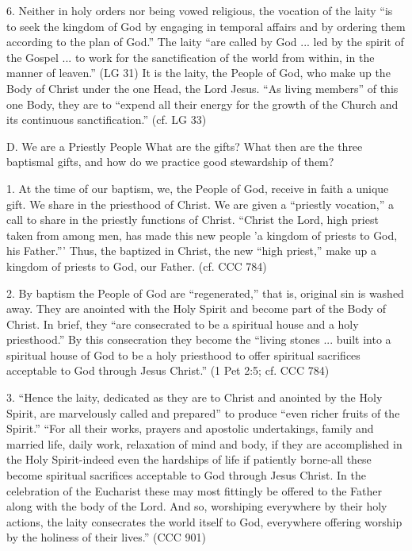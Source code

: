 \documentclass[oneside]{book}
\begin{document}
6. Neither in holy orders nor being vowed religious, the vocation of the laity
``is to seek the kingdom of God by engaging in temporal affairs and by ordering
them according to the plan of God.'' The laity ``are called by God ... led by
the spirit of the Gospel ... to work for the sanctification of the world from
within, in the manner of leaven.'' (LG 31) It is the laity, the People of God,
who make up the Body of Christ under the one Head, the Lord Jesus. ``As living
members'' of this one Body, they are to ``expend all their energy for the growth
of the Church and its continuous sanctification.'' (cf. LG 33)

D. We are a Priestly People
What are the gifts?
What then are the three baptismal gifts, and how do we practice good stewardship
of them?


1. At the time of our baptism, we, the People of God, receive in faith a unique
gift. We share in the priesthood of Christ. We are given a ``priestly
vocation,'' a call to share in the priestly functions of Christ. ``Christ the
Lord, high priest taken from among men, has made this new people 'a kingdom of
priests to God, his Father.''' Thus, the baptized in Christ, the new ``high
priest,'' make up a kingdom of priests to God, our Father. (cf. CCC 784)

2. By baptism the People of God are ``regenerated,'' that is, original sin is
washed away. They are anointed with the Holy Spirit and become part of the Body
of Christ. In brief, they ``are consecrated to be a spiritual house and a holy
priesthood.'' By this consecration they become the ``living stones ... built
into a spiritual house of God to be a holy priesthood to offer spiritual
sacrifices acceptable to God through Jesus Christ.'' (1 Pet 2:5; cf. CCC 784)

3. ``Hence the laity, dedicated as they are to Christ and anointed by the Holy
Spirit, are marvelously called and prepared'' to produce ``even richer fruits of
the Spirit.'' ``For all their works, prayers and apostolic undertakings, family
and married life, daily work, relaxation of mind and body, if they are
accomplished in the Holy Spirit-indeed even the hardships of life if patiently
borne-all these become spiritual sacrifices acceptable to God through Jesus
Christ. In the celebration of the Eucharist these may most fittingly be offered
to the Father along with the body of the Lord. And so, worshiping everywhere by
their holy actions, the laity consecrates the world itself to God, everywhere
offering worship by the holiness of their lives.'' (CCC 901)
\end{document}

